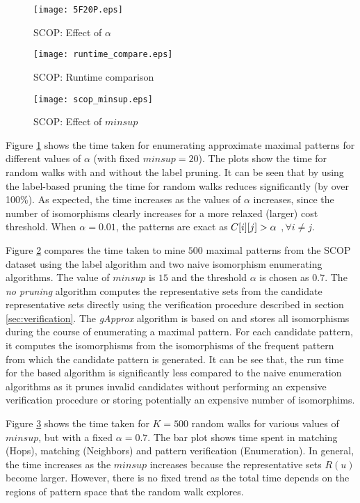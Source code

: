 \begin{figure}[!ht]
	\centerline{
    \texttt{[image: 5F20P.eps]}
	}
	\caption{SCOP: Effect of $\alpha$}
    \label{fig:5F20P}
\end{figure}

\begin{figure}[!ht]
  \centerline{
    \texttt{[image: runtime\_compare.eps]}
	}
    \caption{SCOP: Runtime comparison}
    \label{fig:runtime}
\end{figure}

\begin{figure}[!ht]
  \centerline{
    \texttt{[image: scop\_minsup.eps]}
	}
	\caption{SCOP: Effect of $minsup$}
    \label{fig:5F20P_ft}
\end{figure}


\smallskip{}
Figure \ref{fig:5F20P} shows the time taken for enumerating approximate
maximal patterns for different values of $\alpha$ (with fixed $minsup =
20$). The plots show the time for random walks with and without the
label pruning. It can be seen that by using the label-based pruning the
time for random walks reduces significantly (by over 100\%).  As
expected, the time increases as the values of $\alpha$ increases, since
the number of isomorphisms clearly increases for a more relaxed (larger)
cost threshold.  When $\alpha = 0.01$, the patterns are exact as
${C}[i][j] > \alpha$ $,\forall i \neq j$.

Figure \ref{fig:runtime} compares the time taken to mine $500$
maximal patterns from the SCOP dataset using the \ncl label algorithm
and two naive isomorphism enumerating algorithms. 
The value of $minsup$ is $15$ and
the threshold $\alpha$ is chosen as $0.7$.
The \textit{no pruning}
algorithm computes the representative sets from the candidate representative
sets directly using the verification procedure described in
section \ref{sec:verification}. The \textit{gApprox} algorithm is based on
\cite{gapprox} and stores all isomorphisms during the course of enumerating
a maximal pattern. For each candidate pattern, it computes the isomorphisms
from the isomorphisms of the frequent pattern from which the candidate 
pattern is generated. It can be see that, the run time for the \ncl based 
algorithm is significantly less compared to the naive enumeration algorithms 
as it prunes invalid candidates without performing an expensive verification
procedure or storing potentially an expensive number of isomorphims.


Figure \ref{fig:5F20P_ft} shows the time taken for $K=500$ random walks
for various values of $minsup$, but with a fixed $\alpha = 0.7$. The bar
plot shows time spent in \khop matching (Hops), \ncl matching
(Neighbors) and pattern verification (Enumeration). In general, the time
increases as the $minsup$ increases because the representative sets
$R(u)$ become larger. However, there is no fixed trend as the total time
depends on the regions of pattern space that the random walk explores.


